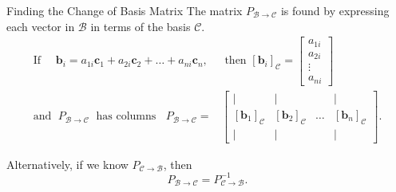 \documentclass[10pt, aspectratio=169]{beamer}
\begin{document}
\begin{frame}{Finding the Change of Basis Matrix}
The matrix \( P_{\mathcal{B}\to \mathcal{C}} \) is found by expressing each vector in \(\mathcal{B}\) in terms of the basis \(\mathcal{C}\).
\begin{eqnarray*}
\text{If }\quad\mathbf{b}_i = a_{1i} \mathbf{c}_1 + a_{2i} \mathbf{c}_2 + \dots + a_{ni} \mathbf{c}_n, &\text{ then } [\mathbf{b}_i]_{\mathcal{C}} =
\begin{bmatrix} a_{1i}\\ a_{2i}\\ \vdots\\ a_{ni} \end{bmatrix}
\\
\text{and }\;P_{\mathcal{B}\to \mathcal{C}}\; \text{ has columns }\;\; P_{\mathcal{B}\to \mathcal{C}} =& \begin{bmatrix} | & | & & | \\ [\mathbf{b}_1]_{\mathcal{C}} & [\mathbf{b}_2]_{\mathcal{C}} & \dots & [\mathbf{b}_n]_{\mathcal{C}} \\ | & | & & | \end{bmatrix}.
\end{eqnarray*}

Alternatively, if we know \( P_{\mathcal{C}\to \mathcal{B}} \), then
\[
P_{\mathcal{B}\to \mathcal{C}} = P_{\mathcal{C}\to \mathcal{B}}^{-1}.
\]
\end{frame}
\end{document}
